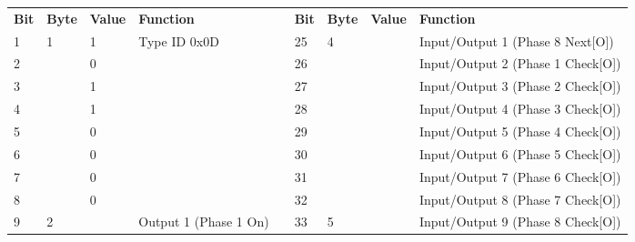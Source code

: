 \documentclass[]{article}
\begin{document}
\begin{landscape}
	\begin{table}[]
		\centering
		\begin{tabular}{lllllllll}
			\cline{1-4} \cline{6-9}
			\textbf{Bit} & \textbf{Byte}      & \textbf{Value}    & \textbf{Function}             & \multirow{9}{*}{} & \textbf{Bit} & \textbf{Byte}      & \textbf{Value}    & \textbf{Function}                     \\ \cline{1-4} \cline{6-9} 
			1            & \multirow{8}{*}{1} & 1                 & \multirow{8}{*}{Type ID 0x0D} &                   & 25           & \multirow{8}{*}{4} & \multirow{8}{*}{} & Input/Output 1 (Phase 8 Next{[}O{]})  \\
			2            &                    & 0                 &                               &                   & 26           &                    &                   & Input/Output 2 (Phase 1 Check{[}O{]}) \\
			3            &                    & 1                 &                               &                   & 27           &                    &                   & Input/Output 3 (Phase 2 Check{[}O{]}) \\
			4            &                    & 1                 &                               &                   & 28           &                    &                   & Input/Output 4 (Phase 3 Check{[}O{]}) \\
			5            &                    & 0                 &                               &                   & 29           &                    &                   & Input/Output 5 (Phase 4 Check{[}O{]}) \\
			6            &                    & 0                 &                               &                   & 30           &                    &                   & Input/Output 6 (Phase 5 Check{[}O{]}) \\
			7            &                    & 0                 &                               &                   & 31           &                    &                   & Input/Output 7 (Phase 6 Check{[}O{]}) \\
			8            &                    & 0                 &                               &                   & 32           &                    &                   & Input/Output 8 (Phase 7 Check{[}O{]}) \\ \cline{1-4} \cline{6-9} 
			9            & \multirow{8}{*}{2} & \multirow{8}{*}{} & Output 1 (Phase 1 On)         &                   & 33           & \multirow{8}{*}{5} &                   & Input/Output 9 (Phase 8 Check{[}O{]}) \\ \cline{8-9} 

\end{tabular}
\end{table}
\end{landscape}
\end{document}
